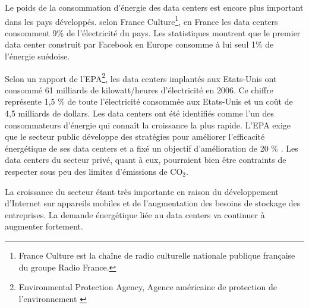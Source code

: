 \begin{onehalfspace}
Le poids de la consommation d'énergie des data centers est encore plus important dans les pays développés. selon France Culture\footnote{France Culture est la chaîne de radio culturelle nationale publique française du groupe Radio France.}, en France les data centers consomment 9\% de l’électricité du pays. Les statistiques montrent que le  premier data center construit par Facebook en Europe consomme à lui seul 1\% de l’énergie suédoise.\medskip 

Selon un rapport de l'EPA\footnote{Environmental Protection Agency, Agence américaine de protection de l'environnement \cite{ref3}}, les data centers implantés aux Etats-Unis ont consommé 61 milliards de kilowatt/heures d'électricité en 2006. Ce chiffre représente 1,5 \% de toute l'électricité consommée aux Etats-Unis et un coût de 4,5 milliards de dollars. Les data centers ont été identifiés comme l'un des consommateurs d'énergie qui connaît la croissance la plus rapide. L'EPA exige que le secteur public développe des stratégies pour améliorer l'efficacité énergétique de ses data centers et a fixé un objectif d'amélioration de 20 \% \cite{ref3}. Les data centers du secteur privé, quant à eux, pourraient bien être contraints de respecter sous peu des limites d'émissions de CO$_{2}$.\medskip 

La croissance du secteur étant très importante en raison du développement d'Internet sur appareils mobiles et de l'augmentation des besoins de stockage des entreprises. La demande énergétique liée au data centers va continuer à augmenter fortement.
\end{onehalfspace}
